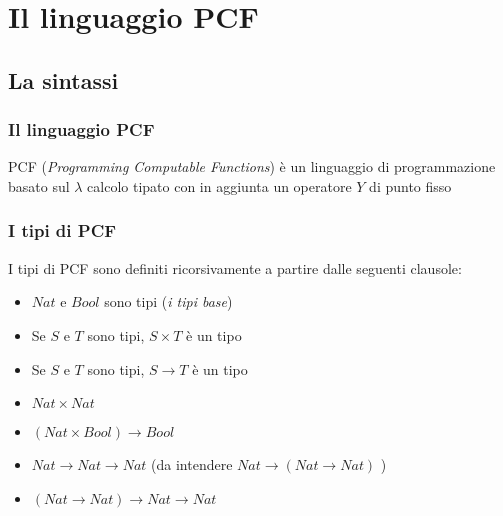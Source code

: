 \documentclass{beamer}
\begin{document}
\small


\section{Il linguaggio PCF}
\subsection{La sintassi}

\begin{frame}
	\frametitle{Il linguaggio PCF}
	
	PCF (\emph{Programming Computable Functions}) è un linguaggio di programmazione basato sul $\lambda$ calcolo tipato con in aggiunta un operatore $Y$ di punto fisso
	


	
\end{frame}



\begin{frame}
	\frametitle{I tipi di PCF}
	
	I tipi di PCF sono definiti ricorsivamente a partire dalle seguenti clausole:
	\begin{itemize}
		\item $Nat$ e $Bool$ sono tipi (\emph{i tipi base})
		\item Se $S$ e $T$ sono tipi, $S\times T$ è un tipo
		\item Se $S$ e $T$ sono tipi, $S\rightarrow T$ è un tipo
	\end{itemize}
	
	\begin{example}
		\begin{itemize}
			\item $Nat\times Nat$
			\item $(Nat\times Bool) \rightarrow Bool$
			\item $Nat\rightarrow Nat\rightarrow Nat$ (da intendere $Nat\rightarrow (Nat\rightarrow Nat)$  )
			\item $(Nat \rightarrow Nat) \rightarrow Nat \rightarrow Nat$
		\end{itemize}

	\end{example}

	
\end{frame}
\end{document}
